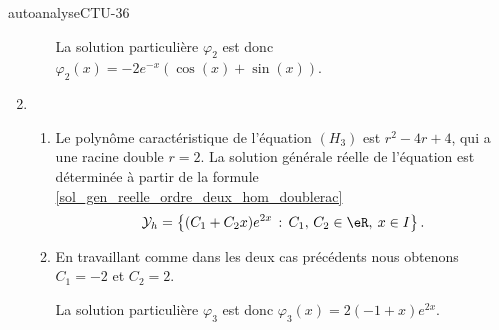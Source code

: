 \begin{corrige}{autoanalyseCTU-36}
\begin{enumerate}
\begin{enumerate}
 La solution particulière $\varphi_{2}$ est donc $\varphi_{2}(x)= -2e^{-x}\left(\cos(x) +\sin(x)\right)$.
\end{enumerate}
\item \begin{enumerate}
\item  Le polyn\^ome caractéristique de l'équation $(H_{3})$ est  $r^2-4r+4$, qui a une racine double $r=2$. La solution générale réelle de l'équation est déterminée à partir de la formule \eqref{sol_gen_reelle_ordre_deux_hom_doublerac}
  \begin{equation*}
    \mathcal{Y}_h  = \left\{(C_1  +C_2x) e^{2 x} \,:\, C_1,\, C_2 \in \eR, \: x\in I\right\}.
  \end{equation*} 
\item En travaillant comme dans les deux cas précédents nous obtenons  $C_1 = -2$ et $C_2= 2$.

 La solution particulière $\varphi_{3}$ est donc $\varphi_{3}(x)=2(-1+ x) e^{2 x} $.
\end{enumerate}

\end{enumerate}

\end{corrige}   
